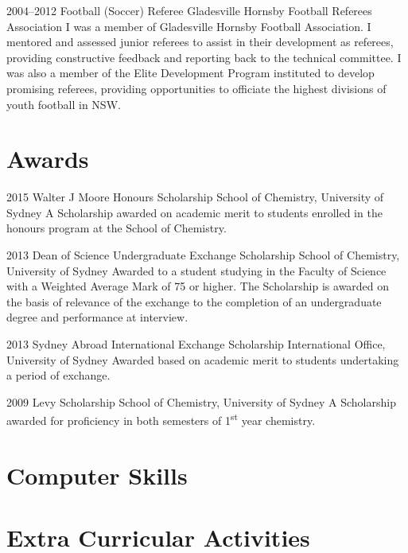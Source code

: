 \cventry
{2004--2012}
{Football (Soccer) Referee}
{Gladesville Hornsby Football Referees Association}
{}{}
{I was a member of Gladesville Hornsby Football Association. I mentored and assessed junior referees to assist in their development as referees, providing constructive feedback and reporting back to the technical committee. I was also a member of the Elite Development Program instituted to develop promising referees, providing opportunities to officiate the highest divisions of youth football in NSW.}

\section{Awards}

\cventry
{2015}
{Walter J Moore Honours Scholarship}
{School of Chemistry, University of Sydney}
{}{}
{A Scholarship awarded on academic merit to students enrolled in the honours program at the School of Chemistry.}

\cventry
{2013}
{Dean of Science Undergraduate Exchange Scholarship}
{School of Chemistry, University of Sydney}
{}{}
{Awarded to a student studying in the Faculty of Science with a Weighted Average Mark of 75 or higher. The Scholarship is awarded on the basis of relevance of the exchange to the completion of an undergraduate degree and performance at interview.}

\cventry
{2013}
{Sydney Abroad International Exchange Scholarship}
{International Office, University of Sydney}
{}{}
{Awarded based on academic merit to students undertaking a period of exchange.}

\cventry
{2009}
{Levy Scholarship}
{School of Chemistry, University of Sydney}
{}{}
{A Scholarship awarded for proficiency in both semesters of 1\textsuperscript{st} year chemistry.}

\section{Computer Skills}

\section{Extra Curricular Activities}

